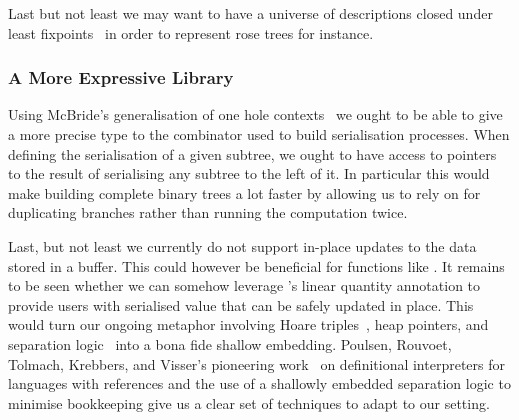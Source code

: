 Last but not least we may want to have a universe of descriptions closed
under least fixpoints~\citep{DBLP:phd/ethos/Morris07}
in order to represent rose trees for instance.

\subsubsection{A More Expressive Library}

Using McBride's generalisation of one hole contexts~\citep{DBLP:conf/popl/McBride08}
we ought to be able to give a more precise type to the combinator
\IdrisFunction{(\#)} used to build serialisation processes.
%
When defining the serialisation of a given subtree, we ought to have access to
pointers to the result of serialising any subtree to the left of it. In particular
this would make building complete binary trees a lot faster by allowing us to rely
on  for duplicating branches rather than running the computation
twice.

Last, but not least we currently do not support in-place updates to
the data stored in a buffer.
This could however be beneficial for functions like .
%
It remains to be seen whether we can somehow leverage \idris{}'s
linear quantity annotation to provide users with serialised value that
can be safely updated in place.
%
This would turn our ongoing metaphor involving
Hoare triples~\citep{DBLP:journals/cacm/Hoare69},
heap pointers,
and separation logic~\citep{DBLP:conf/lics/Reynolds02}
into a bona fide shallow embedding.
%
Poulsen, Rouvoet, Tolmach, Krebbers, and Visser's
pioneering work~\citep{DBLP:journals/pacmpl/PoulsenRTKV18,DBLP:phd/basesearch/Rouvoet21}
on definitional interpreters for languages with references
and the use of a shallowly embedded separation logic to
minimise bookkeeping give us a clear set of techniques
to adapt to our setting.
